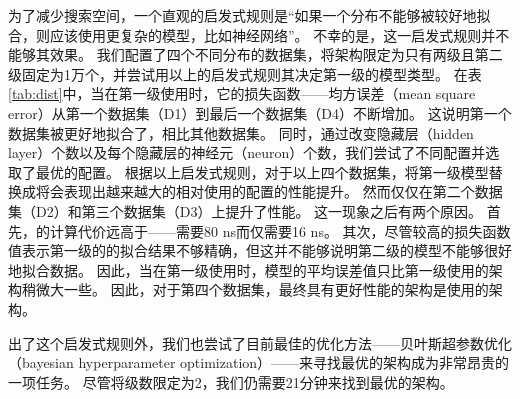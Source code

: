 为了减少搜索空间，一个直观的启发式规则是``如果一个分布不能够被{\lr}较好地拟合，则应该使用更复杂的模型，比如神经网络''。
不幸的是，这一启发式规则并不能够其效果。
我们配置了四个不同分布的数据集，将{\li}架构限定为只有两级且第二级固定为1万个{\lr}，并尝试用以上的启发式规则其决定第一级的模型类型。
在表\ref{tab:dist}中，当在第一级使用{\lr}时，它的损失函数{------}均方误差（mean square error）从第一个数据集（D1）到最后一个数据集（D4）不断增加。
这说明第一个数据集被{\lr}更好地拟合了，相比其他数据集。
同时，通过改变隐藏层（hidden layer）个数以及每个隐藏层的神经元（neuron）个数，我们尝试了不同{\nn}配置并选取了最优的{\nn}配置。
根据以上启发式规则，对于以上四个数据集，将第一级模型替换成{\nn}将会表现出越来越大的相对使用{\lr}的{\li}配置的性能提升。
然而{\nn}仅仅在第二个数据集（D2）和第三个数据集（D3）上提升了性能。
这一现象之后有两个原因。
首先，{\nn}的计算代价远高于{\lr}{------}{\nn}需要80 ns而{\lr}仅需要16 ns。
其次，尽管较高的损失函数值表示第一级的{\lr}的拟合结果不够精确，但这并不能够说明第二级的模型不能够很好地拟合数据。
因此，当在第一级使用{\lr}时，模型的平均误差值只比第一级使用{\nn}的架构稍微大一些。
因此，对于第四个数据集，最终具有更好性能的架构是使用{\lr}的架构。


出了这个启发式规则外，我们也尝试了目前最佳的优化方法{------}贝叶斯超参数优化（bayesian hyperparameter optimization）{------}来寻找最优的{\li}架构成为非常昂贵的一项任务。
尽管将级数限定为2，我们仍需要21分钟来找到最优的架构。

